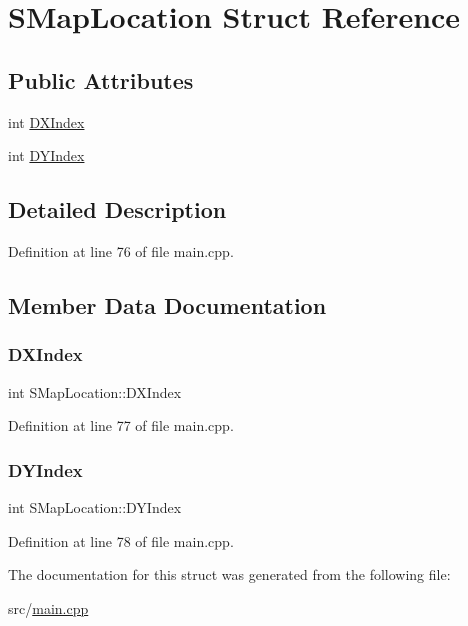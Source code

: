 \hypertarget{structSMapLocation}{}\section{S\+Map\+Location Struct Reference}
\label{structSMapLocation}
\subsection*{Public Attributes}
\begin{DoxyCompactItemize}
\item 
int \hyperlink{structSMapLocation_a4e54e22bebd7f1c262f8b412da4d755d}{D\+X\+Index}
\item 
int \hyperlink{structSMapLocation_a8897c7c5ddbcf79077daaf0fdfefb028}{D\+Y\+Index}
\end{DoxyCompactItemize}


\subsection{Detailed Description}


Definition at line 76 of file main.\+cpp.



\subsection{Member Data Documentation}
\hypertarget{structSMapLocation_a4e54e22bebd7f1c262f8b412da4d755d}{}\label{structSMapLocation_a4e54e22bebd7f1c262f8b412da4d755d} 
\subsubsection{\texorpdfstring{D\+X\+Index}{DXIndex}}
{\footnotesize\ttfamily int S\+Map\+Location\+::\+D\+X\+Index}



Definition at line 77 of file main.\+cpp.

\hypertarget{structSMapLocation_a8897c7c5ddbcf79077daaf0fdfefb028}{}\label{structSMapLocation_a8897c7c5ddbcf79077daaf0fdfefb028} 
\subsubsection{\texorpdfstring{D\+Y\+Index}{DYIndex}}
{\footnotesize\ttfamily int S\+Map\+Location\+::\+D\+Y\+Index}



Definition at line 78 of file main.\+cpp.



The documentation for this struct was generated from the following file\+:\begin{DoxyCompactItemize}
\item 
src/\hyperlink{main_8cpp}{main.\+cpp}\end{DoxyCompactItemize}
